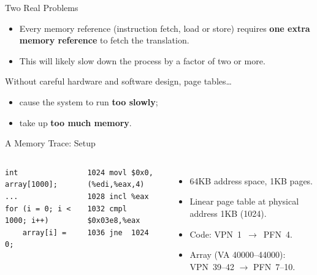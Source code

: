 \begin{frame}{Two Real Problems}

\begin{itemize}
    \item Every memory reference (instruction fetch, load or store) requires
          \textbf{one extra memory reference} to fetch the translation.
    \item This will likely slow down the process by a factor of two or more.
\end{itemize}

\begin{alertblock}{Without careful hardware and software design, page tables\ldots}
\begin{itemize}
    \item cause the system to run \textbf{too slowly};
    \item take up \textbf{too much memory}.
\end{itemize}
\end{alertblock}

\end{frame}

\begin{frame}[fragile]{A Memory Trace: Setup}

\begin{columns}[T]

\begin{lstlisting}[style=CStyle]
int array[1000];
...
for (i = 0; i < 1000; i++)
    array[i] = 0;
\end{lstlisting}

{\footnotesize
\begin{verbatim}
1024 movl $0x0,(%edi,%eax,4)
1028 incl %eax
1032 cmpl $0x03e8,%eax
1036 jne  1024
\end{verbatim}
}

\begin{itemize}
    \item 64KB address space, 1KB pages.
    \item Linear page table at physical address 1KB (1024).
    \item Code: VPN~1~$\rightarrow$~PFN~4.
    \item Array (VA 40000--44000):
          VPN~39--42 $\rightarrow$ PFN~7--10.
\end{itemize}

\end{columns}

\end{frame}

